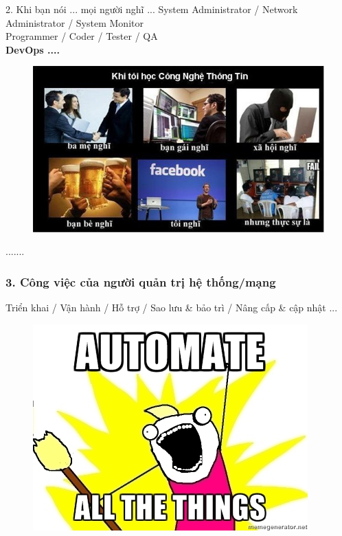 \documentclass[10pt]{beamer}
\begin{document}
\label{Khi toi noi}
\begin{frame}{2. Khi bạn nói ... mọi người nghĩ ...}
System Administrator / Network Administrator / System Monitor \\
Programmer / Coder / Tester / QA  \\
\textbf{DevOps ....}
\framebreak
\pause
\begin{figure}[!ht]
\centering
			\includegraphics[scale=0.5]{khibannoi}
\end{figure}
.......

\end{frame}
\label{Python & Cong viec}
\begin{frame}
\frametitle{3. Công việc của người quản trị hệ thống/mạng}
\pause Triển khai \pause / Vận hành \pause / Hỗ trợ \pause / Sao lưu \& bảo trì \pause / Nâng cấp \& cập nhật ...\\
\pause
{}
\label{Chu y tai lieu commnet 3}
\framebreak
\pause
\begin{figure}[!ht]
\centering
			\includegraphics[scale=0.5]{automate-all-the-things}
\end{figure}
\end{frame}
\end{document}
